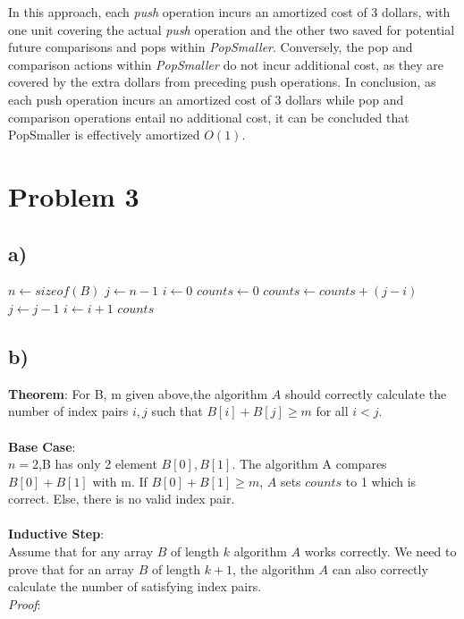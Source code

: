 \documentclass[12pt]{article}
\begin{document}
In this approach, each \textit{push} operation incurs
an amortized cost of 3 dollars, with one unit covering the actual 
\textit{push} operation and the other two saved for potential 
future comparisons and pops within \textit{PopSmaller}. 
Conversely, the pop and comparison actions within \textit{PopSmaller}
do not incur additional cost, as they are covered by the extra dollars
from preceding push operations.
In conclusion, as each push operation incurs an amortized cost of 
3 dollars while pop and comparison operations entail no additional cost, 
it can be concluded that PopSmaller is effectively amortized $O(1)$.

\newpage

\section*{Problem 3}

\subsection*{a)}
\begin{algorithm}
    \begin{algorithmic}[1]
        \State $n \gets sizeof(B)$
        \State $j \gets n - 1$
        \State $i \gets 0$
        \State $counts \gets 0$
                \State $counts \gets counts + (j - i)$
                \State $j \gets j - 1$
            \Else
                \State $i \gets i + 1$
            \EndIf
        \EndWhile
        \State \Return $counts$
    \EndFunction
    \end{algorithmic}
\end{algorithm}



\subsection*{b)}
\textbf{Theorem}: For B, m given above,the algorithm $A$ should correctly
calculate the number of index pairs $i, j$ such that $B[i] + B[j] \geq m$
for all $i < j$.\\\\
\textbf{Base Case}: \\
$n = 2$,B has only 2 element $B[0], B[1]$. The algorithm A compares $B[0]
+ B[1]$ with m. If $B[0] + B[1] \geq m$, $A$ sets $counts$ to 1 which is 
correct. Else, there is no valid index pair.\\\\
\textbf{Inductive Step}:\\
Assume that for any array $B$ of length $k$ algorithm $A$ works correctly.
We need to prove that for an array $B$ of length $k+1$, the algorithm $A$
can also correctly calculate the number of satisfying index pairs.\\
\textit{Proof}:
\end{document}
